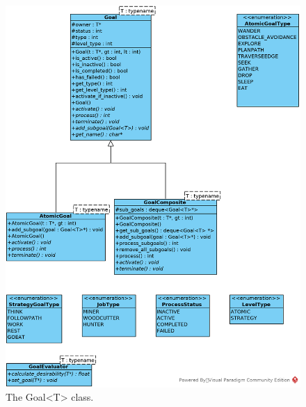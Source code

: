 \begin{figure}[!htb]
    \centering
    \includegraphics[scale=0.75]{res/Goal.jpg}
    \caption{The Goal<T> class.}\label{fig:goal}
\end{figure}

